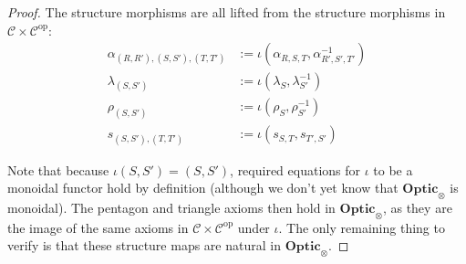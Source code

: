 \documentclass[11pt,a4paper]{article}
\theoremstyle{plain}
\theoremstyle{definition}
\newcommand{\C}{\mathscr{C}}
\newcommand{\Optic}{\mathbf{Optic}}
\newcommand{\op}{\mathrm{op}}
\newcommand{\todo}[1]{\textcolor{red}{\small #1}}
\begin{document}
\begin{proof}

The structure morphisms are all lifted from the structure morphisms in $\C \times \C^\op$:
\begin{align*}
\alpha_{(R, R'), (S, S'), (T, T')} &:= \iota(\alpha_{R,S,T}, \alpha_{R',S',T'}^{-1}) \\
\lambda_{(S, S')} &:= \iota(\lambda_{S}, \lambda_{S'}^{-1}) \\
\rho_{(S, S')} &:= \iota(\rho_{S}, \rho_{S'}^{-1}) \\
s_{(S, S'), (T, T')} &:= \iota(s_{S, T}, s_{T', S'})
\end{align*}
 
Note that because $\iota(S, S') = (S, S')$, required equations for $\iota$ to be a monoidal functor hold by definition (although we don't yet know that $\Optic_\otimes$ is monoidal). The pentagon and triangle axioms then hold in $\Optic_\otimes$, as they are the image of the same axioms in $\C \times \C^\op$ under $\iota$. The only remaining thing to verify is that these structure maps are natural in $\Optic_\otimes$. 


\end{proof}
\end{document}
